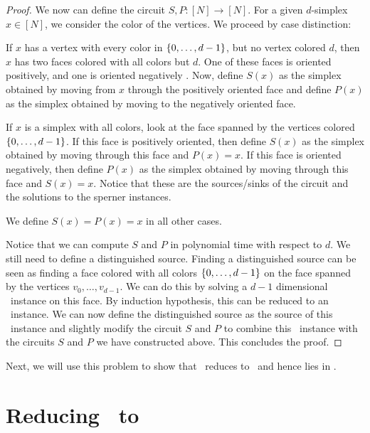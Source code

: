 \begin{proof}
	We now can define the circuit $S, P : [N] \rightarrow [N]$. For a given $d$-simplex $x \in [N]$, we consider the color of the vertices. We proceed by case distinction:
	\begin{case}{1}
		If $x$ has a vertex with every color in $\left\{0, \dots, d-1\right\}$, but no vertex colored $d$, then $x$ has two faces colored with all colors but $d$. One of these faces is oriented positively, and one is oriented negatively . Now, define $S(x)$ as the simplex obtained by moving from $x$ through the positively oriented face and define $P(x)$ as the simplex obtained by moving to the negatively oriented face.
	\end{case}
	\begin{case}{2}
		If $x$ is a simplex with all colors, look at the face spanned by the vertices colored $\left\{0, \dots, d-1\right\}$. If this face is positively oriented, then define $S(x)$ as the simplex obtained by moving through this face and $P(x) = x$. If this face is oriented negatively, then define $P(x)$ as the simplex obtained by moving through this face and $S(x) = x$. Notice that these are the sources/sinks of the circuit and the solutions to the sperner instances.
	\end{case}
	\begin{case}{3}
		We define $S(x) = P(x) = x$ in all other cases.
	\end{case}
	Notice that we can compute $S$ and $P$ in polynomial time with respect to $d$. We still need to define a distinguished source. Finding a distinguished source can be seen as finding a face colored with all colors $\left\{0, \dots, d-1\right\}$ on the face spanned by the vertices $v_0, \dots, v_{d-1}$. We can do this by solving a $d-1$ dimensional \Sperner\ instance on this face. By induction hypothesis, this can be reduced to an \EndOfLine\ instance. We can now define the distinguished source as the source of this \EndOfLine\ instance and slightly modify the circuit $S$ and $P$ to combine this \EndOfLine\ instance with the circuits $S$ and $P$ we have constructed above. This concludes the proof.
\end{proof}

Next, we will use this problem to show that \Tarskistar\ reduces to \Sperner\ and hence lies in \PPAD.

\section{Reducing \Tarskistar\ to \Sperner}
\label{sec:tarskistar_to_sperner}

